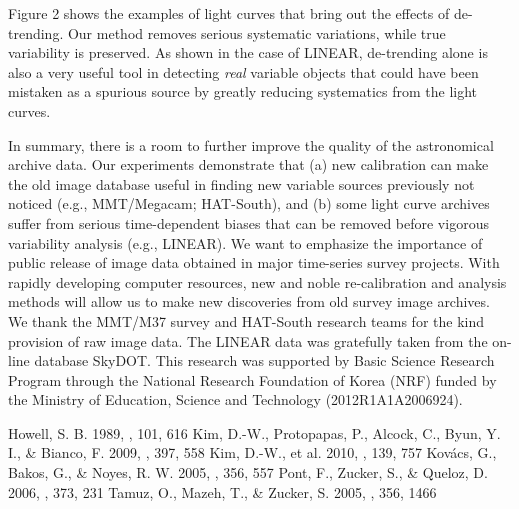 \documentclass[11pt,twoside]{article}
\begin{document}
\noindent Figure 2 shows the examples of light curves that bring out the effects of de-trending.  Our method removes serious systematic variations, while true variability is preserved.  As shown in the case of LINEAR, de-trending alone is also a very useful tool in detecting {\itshape real} variable objects that could have been mistaken as a spurious source by greatly reducing systematics from the light curves.

In summary, there is a room to further improve the quality of the astronomical archive data.  Our experiments demonstrate that (a) new calibration can make the old image database useful in finding new variable sources previously not noticed (e.g., MMT/Megacam; HAT-South), and (b) some light curve archives suffer from serious time-dependent biases that can be removed before vigorous variability analysis (e.g., LINEAR).  We want to emphasize the importance of public release of image data obtained in major time-series survey projects.  With rapidly developing computer resources, new and noble re-calibration and analysis methods will allow us to make new discoveries from old survey image archives.  \\

\acknowledgements We thank the MMT/M37 survey and HAT-South research teams for the kind provision of raw image data.  The LINEAR data was gratefully taken from the on-line database SkyDOT.  This research was supported by Basic Science Research Program through the National Research Foundation of Korea (NRF) funded by the Ministry of Education, Science and Technology (2012R1A1A2006924).

%

\begin{thebibliography}{}
 Howell, S. B. 1989, \pasp, 101, 616
 Kim, D.-W., Protopapas, P., Alcock, C., Byun, Y. I., \& Bianco, F. 2009, \mnras, 397, 558
 Kim, D.-W., et al. 2010, \aj, 139, 757
 Kov\'{a}cs, G., Bakos, G., \& Noyes, R. W. 2005, \mnras, 356, 557
 Pont, F., Zucker, S., \& Queloz, D. 2006, \mnras, 373, 231
 Tamuz, O., Mazeh, T., \& Zucker, S. 2005, \mnras, 356, 1466	
\end{thebibliography}
\end{document}
